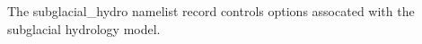 The subglacial\_hydro namelist record controls options assocated with the subglacial hydrology model.
